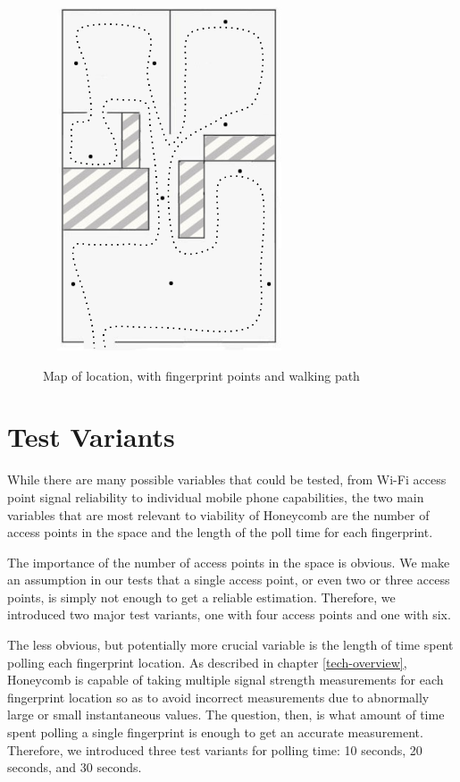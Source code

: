 \begin{figure}[htb] %
	\centering
	\ \includegraphics[width=2.8in,height=4in]{loc1_path.png}
	\caption{Map of location, with fingerprint points and walking path}
	\label{loc1_path}
\end{figure}

\section{Test Variants}
%


While there are many possible variables that could be tested, from Wi-Fi access point signal reliability to individual mobile phone capabilities, the two main variables that are most relevant to viability of Honeycomb are the number of access points in the space and the length of the poll time for each fingerprint.

The importance of the number of access points in the space is obvious. We make an assumption in our tests that a single access point, or even two or three access points, is simply not enough to get a reliable estimation. Therefore, we introduced two major test variants, one with four access points and one with six. 

The less obvious, but potentially more crucial variable is the length of time spent polling each fingerprint location. As described in chapter \ref{tech-overview}, Honeycomb is capable of taking multiple signal strength measurements for each fingerprint location so as to avoid incorrect measurements due to abnormally large or small instantaneous values. The question, then, is what amount of time spent polling a single fingerprint is enough to get an accurate measurement. Therefore, we introduced three test variants for polling time: 10 seconds, 20 seconds, and 30 seconds.

